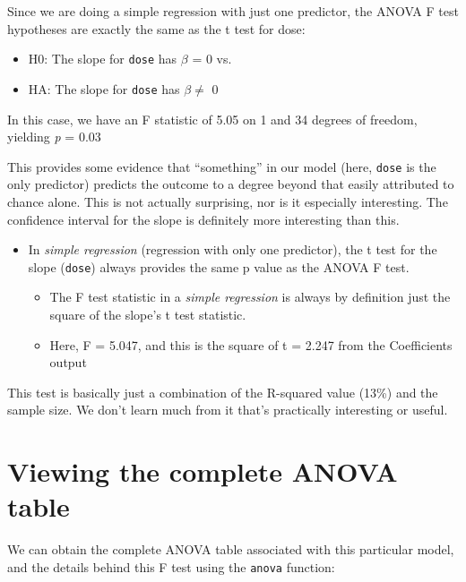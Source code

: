 \documentclass[
]{book}
\providecommand{\tightlist}{%
  \setlength{\itemsep}{0pt}\setlength{\parskip}{0pt}}
\begin{document}
Since we are doing a simple regression with just one predictor, the ANOVA F test hypotheses are exactly the same as the t test for dose:

\begin{itemize}
\tightlist
\item
  H0: The slope for \texttt{dose} has \(\beta\) = 0 vs.
\item
  HA: The slope for \texttt{dose} has \(\beta \neq\) 0
\end{itemize}

In this case, we have an F statistic of 5.05 on 1 and 34 degrees of freedom, yielding \emph{p} = 0.03

This provides some evidence that ``something'' in our model (here, \texttt{dose} is the only predictor) predicts the outcome to a degree beyond that easily attributed to chance alone. This is not actually surprising, nor is it especially interesting. The confidence interval for the slope is definitely more interesting than this.

\begin{itemize}
\tightlist
\item
  In \emph{simple regression} (regression with only one predictor), the t test for the slope (\texttt{dose}) always provides the same p value as the ANOVA F test.

  \begin{itemize}
  \tightlist
  \item
    The F test statistic in a \emph{simple regression} is always by definition just the square of the slope's t test statistic.
  \item
    Here, F = 5.047, and this is the square of t = 2.247 from the Coefficients output
  \end{itemize}
\end{itemize}

This test is basically just a combination of the R-squared value (13\%) and the sample size. We don't learn much from it that's practically interesting or useful.

\hypertarget{viewing-the-complete-anova-table}{%
\section{Viewing the complete ANOVA table}\label{viewing-the-complete-anova-table}}

We can obtain the complete ANOVA table associated with this particular model, and the details behind this F test using the \texttt{anova} function:
\end{document}
